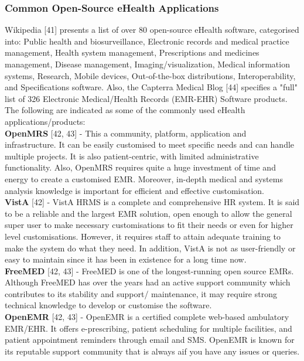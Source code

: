\documentclass[a4paper]{article}
\begin{document}
\subsubsection{Common Open-Source eHealth Applications}
Wikipedia [41] presents a list of over 80 open-source eHealth software, categorised into: Public health and biosurveillance, Electronic records and medical practice management, Health system management, Prescriptions and medicines management, Disease management, Imaging/visualization, Medical information systems, Research, Mobile devices, Out-of-the-box distributions, Interoperability, and Specifications software. Also, the Capterra Medical Blog [44] specifies a "full" list of 326 Electronic Medical/Health Records (EMR-EHR) Software products. The following are indicated as some of the commonly used eHealth applications/products:\\ 

{\bf OpenMRS} [42, 43] - This a community, platform, application and infrastructure. It can be easily customised to meet specific needs and can handle multiple projects. It is also patient-centric, with limited administrative functionality. Also, OpenMRS requires quite a huge investment of time and energy to create a customised EMR. Moreover, in-depth medical and systems analysis knowledge is important for efficient and effective customisation. \\

{\bf VistA} [42] - VistA HRMS is a complete and comprehensive HR system. It is said to be a reliable and the largest EMR solution, open enough to allow the general super user to make necessary customisations to fit their needs or even for higher level customisations. However, it requires staff to attain adequate training to make the system do what they need. In addition, VistA is not as user-friendly or easy to maintain since it has been in existence for a long time now.\\ 

{\bf FreeMED} [42, 43] - FreeMED is one of the longest-running open source EMRs. Although FreeMED has over the years had an active support community which contributes to its stability and support/ maintenance, it may require strong technical knowledge to develop or customise the software. \\ 

{\bf OpenEMR} [42, 43] - OpenEMR is a certified complete web-based ambulatory EMR/EHR. It offers e-prescribing, patient scheduling for multiple facilities, and patient appointment reminders through email and SMS. OpenEMR is known for its reputable support community that is always aif you have any issues or queries. \\ 
\end{document}
